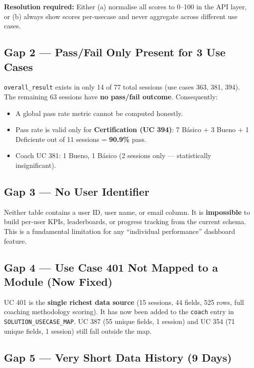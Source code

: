 \documentclass[12pt,a4paper]{article}
\begin{document}
\textbf{Resolution required:} Either (a) normalise all scores to 0--100 in the
API layer, or (b) always show scores per-usecase and never aggregate across
different use cases.

\subsection{Gap 2 --- Pass/Fail Only Present for 3 Use Cases}

\texttt{overall\_result} exists in only 14 of 77 total sessions (use cases 363, 381,
394).  The remaining 63 sessions have \textbf{no pass/fail outcome}.
Consequently:

\begin{itemize}[leftmargin=*]
  \item A global pass rate metric cannot be computed honestly.
  \item Pass rate is valid only for \textbf{Certification (UC 394)}: 7 Básico + 3 Bueno + 1 Deficiente out of 11 sessions = \textbf{90.9\%} pass.
  \item Coach UC 381: 1 Bueno, 1 Básico (2 sessions only --- statistically insignificant).
\end{itemize}

\subsection{Gap 3 --- No User Identifier}

Neither table contains a user ID, user name, or email column.  It is
\textbf{impossible} to build per-user KPIs, leaderboards, or progress tracking
from the current schema.  This is a fundamental limitation for any
``individual performance'' dashboard feature.

\subsection{Gap 4 --- Use Case 401 Not Mapped to a Module (Now Fixed)}

UC 401 is the \textbf{single richest data source} (15 sessions, 44 fields,
525 rows, full coaching methodology scoring).  It has now been added to the
\texttt{coach} entry in \texttt{SOLUTION\_USECASE\_MAP}.  UC 387 (55 unique
fields, 1 session) and UC 354 (71 unique fields, 1 session) still fall outside
the map.

\subsection{Gap 5 --- Very Short Data History (9 Days)}
\end{document}
